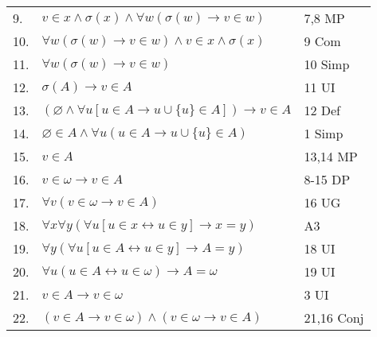 \documentclass[12pt, a4paper]{article}
\begin{document}
\begin{table}[h!]
\begin{center}
\begin{tabular}{l l l}
        9. & \hspace{10mm}$v\in x\wedge\sigma(x)\wedge\forall w(\sigma(w)\rightarrow v\in w)$ & 7,8 MP\\
        
        10.& \hspace{10mm}$\forall w(\sigma(w)\rightarrow v\in w)\wedge v\in x\wedge\sigma(x)$ & 9 Com\\
        
        11.& \hspace{10mm}$\forall w(\sigma(w)\rightarrow v\in w)$ & 10 Simp\\
        
        12.& \hspace{10mm}$\sigma(A)\rightarrow v\in A$ & 11 UI\\
        
        13.& \hspace{10mm}$(\varnothing\wedge\forall u[u\in A\rightarrow u\cup\{u\}\in A])\rightarrow v\in A$ & 12         Def\\
        
        14.& \hspace{10mm}$\varnothing\in A\wedge\forall u(u\in A\rightarrow u\cup\{u\}\in A)$ & 1 Simp\\
        
        15.& \hspace{10mm}$v\in A$ & 13,14 MP\\
        
        16.& $v\in\omega\rightarrow v\in A$ & 8-15 DP\\
        
        17.& $\forall v(v\in\omega\rightarrow v\in A)$ & 16 UG\\
        
        18.& $\forall x\forall y(\forall u[u\in x\leftrightarrow u\in y]\rightarrow x=y)$ & A3\\
        
        19.& $\forall y(\forall u[u\in A\leftrightarrow u\in y]\rightarrow A=y)$ & 18 UI\\
        
        20.& $\forall u(u\in A\leftrightarrow u\in\omega)\rightarrow A=\omega$ & 19 UI\\
        
        21.& $v\in A\rightarrow v\in\omega$ & 3 UI\\
        
        22.& $(v\in A\rightarrow v\in\omega)\wedge(v\in\omega\rightarrow v\in A)$ & 21,16 Conj\\
        

\end{tabular}
\end{center}
\end{table}
\end{document}
